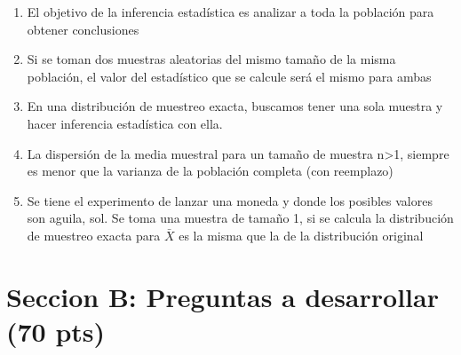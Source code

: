 \documentclass[addpoints]{exam}
\theoremstyle{mytheor}
\begin{document}
\begin{questions}
  \begin{enumerate}
  \item El objetivo de la inferencia estadística es analizar a toda la población para obtener conclusiones
  \item Si se toman dos muestras aleatorias del mismo tamaño de la misma población, el valor del estadístico que se calcule será el mismo para ambas
  \item En una distribución de muestreo exacta, buscamos tener una sola muestra y hacer inferencia estadística con ella. 
  \item La dispersión de la media muestral para un tamaño de muestra n>1, siempre es menor que la varianza de la población completa (con reemplazo)
  \item Se tiene el experimento de lanzar una moneda y donde los posibles valores son {aguila, sol}. Se toma una muestra de tamaño 1, si se calcula la distribución de muestreo exacta para $\bar{X}$ es la misma que la de la distribución original
  \end{enumerate}
  
  
\end{questions}
  
  \section*{Seccion B: Preguntas a desarrollar (70 pts)}
  
\end{document}
